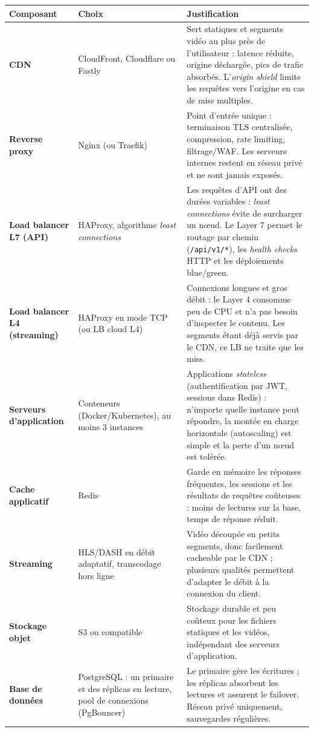 \documentclass[12pt,a4paper]{article}
\begin{document}
\noindent
\begin{tabularx}{\textwidth}{@{}>{\raggedright\arraybackslash}p{2.7cm} >{\raggedright\arraybackslash}p{2.6cm} Y@{}}
\toprule
\textbf{Composant} & \textbf{Choix} & \textbf{Justification} \\
\midrule
\textbf{CDN} & CloudFront, Cloudflare ou Fastly &
Sert statiques et segments vid\'eo au plus pr\`es de l'utilisateur : latence r\'eduite, origine d\'echarg\'ee, pics de trafic absorb\'es. L'\textit{origin shield} limite les requ\^etes vers l'origine en cas de miss multiples. \\
\midrule
\textbf{Reverse proxy} & Nginx (ou Traefik) &
Point d'entr\'ee unique : terminaison TLS centralis\'ee, compression, rate limiting, filtrage/WAF. Les serveurs internes restent en r\'eseau priv\'e et ne sont jamais expos\'es. \\
\midrule
\textbf{Load balancer L7 (API)} & HAProxy, algorithme \textit{least connections} &
Les requ\^etes d'API ont des dur\'ees variables : \textit{least connections} \'evite de surcharger un n\oe ud. Le Layer 7 permet le routage par chemin (\texttt{/api/v1/*}), les \textit{health checks} HTTP et les d\'eploiements blue/green. \\
\midrule
\textbf{Load balancer L4 (streaming)} & HAProxy en mode TCP (ou LB cloud L4) &
Connexions longues et gros d\'ebit : le Layer 4 consomme peu de CPU et n'a pas besoin d'inspecter le contenu. Les segments \'etant d\'ej\`a servis par le CDN, ce LB ne traite que les miss. \\
\midrule
\textbf{Serveurs d'application} & Conteneurs (Docker/Kubernetes), au moins 3 instances &
Applications \textit{stateless} (authentification par JWT, sessions dans Redis) : n'importe quelle instance peut r\'epondre, la mont\'ee en charge horizontale (autoscaling) est simple et la perte d'un n\oe ud est tol\'er\'ee. \\
\midrule
\textbf{Cache applicatif} & Redis &
Garde en m\'emoire les r\'eponses fr\'equentes, les sessions et les r\'esultats de requ\^etes co\^uteuses : moins de lectures sur la base, temps de r\'eponse r\'eduit. \\
\midrule
\textbf{Streaming} & HLS/DASH en d\'ebit adaptatif, transcodage hors ligne &
Vid\'eo d\'ecoup\'ee en petits segments, donc facilement cacheable par le CDN ; plusieurs qualit\'es permettent d'adapter le d\'ebit \`a la connexion du client. \\
\midrule
\textbf{Stockage objet} & S3 ou compatible &
Stockage durable et peu co\^uteux pour les fichiers statiques et les vid\'eos, ind\'ependant des serveurs d'application. \\
\midrule
\textbf{Base de donn\'ees} & PostgreSQL : un primaire et des r\'eplicas en lecture, pool de connexions (PgBouncer) &
Le primaire g\`ere les \'ecritures ; les r\'eplicas absorbent les lectures et assurent le failover. R\'eseau priv\'e uniquement, sauvegardes r\'eguli\`eres. \\
\bottomrule
\end{tabularx}
\end{document}
